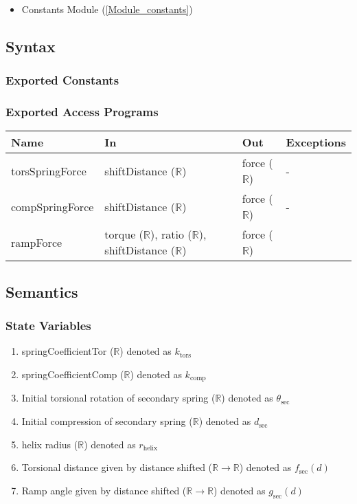 \documentclass[12pt, titlepage]{article}
\begin{document}
\begin{itemize}
  \item Constants Module (\ref{Module_constants})
\end{itemize}

\subsection{Syntax}

\subsubsection{Exported Constants}

\subsubsection{Exported Access Programs}

\begin{center}
\begin{tabular}{p{3cm} p{4cm} p{4cm} p{2cm}}
\hline
\textbf{Name} & \textbf{In} & \textbf{Out} & \textbf{Exceptions} \\
\hline
torsSpringForce & shiftDistance ($\mathbb{R}$) & force ($\mathbb{R}$) & - \\
compSpringForce & shiftDistance ($\mathbb{R}$) & force ($\mathbb{R}$) & - \\
rampForce & torque ($\mathbb{R}$), ratio ($\mathbb{R}$), shiftDistance ($\mathbb{R}$) & force ($\mathbb{R}$) & \\
\hline
\end{tabular}
\end{center}

\subsection{Semantics}

\subsubsection{State Variables}

\begin{enumerate}
  \item springCoefficientTor ($\mathbb{R}$) denoted as $k_{\text{tors}}$
  \item springCoefficientComp ($\mathbb{R}$) denoted as $k_{\text{comp}}$
  \item Initial torsional rotation of secondary spring ($\mathbb{R}$) denoted as $\theta_{\text{sec}}$
  \item Initial compression of secondary spring ($\mathbb{R}$) denoted as $d_{\text{sec}}$
  \item helix radius ($\mathbb{R}$) denoted as $r_{\text{helix}}$
  \item Torsional distance given by distance shifted ($\mathbb{R} \rightarrow \mathbb{R}$) denoted as $f_{\text{sec}}(d)$
  \item Ramp angle given by distance shifted ($\mathbb{R} \rightarrow \mathbb{R}$) denoted as $g_{\text{sec}}(d)$
\end{enumerate}
\end{document}

